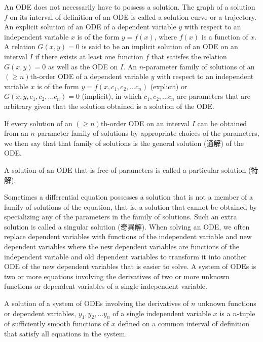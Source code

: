 \documentclass[a4paper,12pt]{report}
\begin{document}
\begin{itemize}
\begin{itemize}
An ODE does not necessarily have to possess a solution.
The graph of a solution $f$ on its interval of definition of an ODE is called a solution curve or a trajectory.
An explicit solution of an ODE of a dependent variable $y$ with respect to an independent variable $x$ is of the form $y=f(x)$, where $f(x)$ is a function of $x$.
A relation $G(x, y) = 0$ is said to be an implicit solution of an ODE on an interval $I$ if there exists at least one function $f$ that satisfes the relation $G(x, y) = 0$ as well as the ODE on $I$.
An $n$-parameter family of solutions of an $(\geq n)$th-order ODE of a dependent variable $y$ with respect to an independent variable $x$ is of the form $y=f(x,c_1,c_2,\dots c_n)$ (explicit) or $G(x,y,c_1,c_2,\dots c_n)=0$ (implicit), in which $c_1,c_2,\dots c_n$ are parameters that are arbitrary given that the solution obtained is a solution of the ODE.

If every solution of an $(\geq n)$th-order ODE on an interval $I$ can be obtained from an $n$-parameter family of solutions by appropriate choices of the parameters, we then say that that family of solutions is the general solution (通解) of the ODE.

A solution of an ODE that is free of parameters is called a particular solution (特解).

Sometimes a differential equation possesses a solution that is not a member of a family of solutions of the equation, that is, a solution that cannot be obtained by specializing any of the parameters in the family of solutions. Such an extra solution is called a singular solution (奇異解).
When solving an ODE, we often replace dependent variables with functions of the independent variable and new dependent variables where the new dependent variables are functions of the independent variable and old dependent variables to transform it into another ODE of the new dependent variables that is easier to solve.
A system of ODEs is two or more equations involving the derivatives of two or more unknown functions or dependent variables of a single independent variable.

A solution of a system of ODEs involving the derivatives of $n$ unknown functions or dependent variables, $y_1,y_2,\dots y_n$ of a single independent variable $x$ is a $n$-tuple of sufficiently smooth functions of $x$ defined on a common interval of definition that satisfy all equations in the system.


\end{itemize}
\end{itemize}
\end{document}
